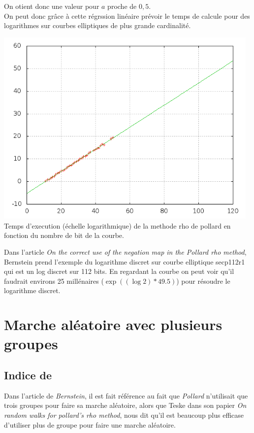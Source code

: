 \documentclass[a4paper,10pt]{report}
\newcommand{\article}{\textit{On the correct use of the negation map in the Pollard rho method}}
\begin{document}
On otient donc une valeur pour $a$ proche de $0,5$.\\

On peut donc grâce à cette régrssion linéaire prévoir le temps de calcule pour des logarithmes sur courbes elliptiques de plus grande cardinalité.

\begin{center}
 \includegraphics[width=13cm]{rho_normal.png}
 Temps d'execution (échelle logarithmique) de la methode rho de pollard en fonction du nombre de bit de la courbe.
\end{center}

Dans l'article \article, Bernstein prend l'exemple du logarithme discret sur courbe elliptique secp112r1 qui est un log discret sur 112 bits. En regardant la courbe on peut voir qu'il faudrait environs 25 millénaires 
($\exp{((\log{2})*49.5)}$) pour résoudre le logarithme discret.


\chapter{Marche aléatoire avec plusieurs groupes}

\section{Indice de}
Dans l'article de \textit{Bernstein}, il est fait référence au fait que \textit{Pollard} n'utilisait que trois groupes pour faire sa marche aléatoire, 
alors que Teske dans son papier \textit{On random walks for pollard's rho method}, nous dit qu'il est beaucoup plus efficase d'utiliser plus de groupe pour faire une marche aléatoire.
\newline
\end{document}
